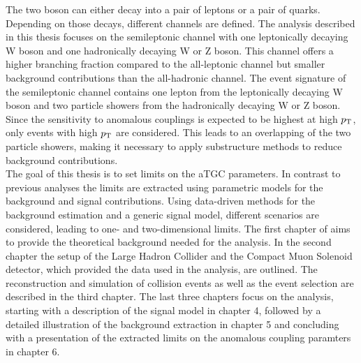 The two boson can either decay into a pair of leptons or a pair of quarks. Depending on those decays, different channels are defined. The analysis described in this thesis focuses on the semileptonic channel with one leptonically decaying W boson and one hadronically decaying W or Z boson. This channel offers a higher branching fraction compared to the all-leptonic channel but smaller background contributions than the all-hadronic channel. The event signature of the semileptonic channel contains one lepton from the leptonically decaying W boson and two particle showers from the hadronically decaying W or Z boson. Since the sensitivity to anomalous couplings is expected to be highest at high $p_{\rm T}$, only events with high $p_{\rm T}$ are considered. This leads to an overlapping of the two particle showers, making it necessary to apply substructure methods to reduce background contributions. \\

The goal of this thesis is to set limits on the aTGC parameters. In contrast to previous analyses the limits are extracted using parametric models for the background and signal contributions. Using data-driven methods for the background estimation and a generic signal model, different scenarios are considered, leading to one- and two-dimensional limits. The first chapter of aims to provide the theoretical background needed for the analysis. In the second chapter the setup of the Large Hadron Collider and the Compact Muon Solenoid detector, which provided the data used in the analysis, are outlined. The reconstruction and simulation of collision events as well as the event selection are described in the third chapter. The last three chapters focus on the analysis, starting with a description of the signal model in chapter 4, followed by a detailed illustration of the background extraction in chapter 5 and concluding with a presentation of the extracted limits on the anomalous coupling paramters in chapter 6.





